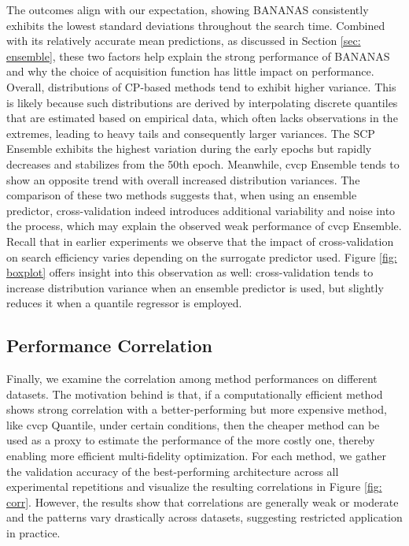 \documentclass[a4paper,oneside,bibliography=totoc]{scrbook}
\begin{document}
The outcomes align with our expectation, showing BANANAS consistently exhibits the lowest standard deviations throughout the search time. Combined with its relatively accurate mean predictions, as discussed in Section \ref{sec: ensemble}, these two factors help explain the strong performance of BANANAS and why the choice of acquisition function has little impact on performance. Overall, distributions of CP-based methods tend to exhibit higher variance. This is likely because such distributions are derived by interpolating discrete quantiles that are estimated based on empirical data, which often lacks observations in the extremes, leading to heavy tails and consequently larger variances. The SCP Ensemble exhibits the highest variation during the early epochs but rapidly decreases and stabilizes from the 50th epoch. Meanwhile, \gls{cvcp} Ensemble tends to show an opposite trend with overall increased distribution variances. The comparison of these two methods suggests that, when using an ensemble predictor, cross-validation indeed introduces additional variability and noise into the process, which may explain the observed weak performance of \gls{cvcp} Ensemble. Recall that in earlier experiments we observe that the impact of cross-validation on search efficiency varies depending on the surrogate predictor used. Figure \ref{fig: boxplot} offers insight into this observation as well: cross-validation tends to increase distribution variance when an ensemble predictor is used, but slightly reduces it when a quantile regressor is employed.

\subsection{Performance Correlation}
Finally, we examine the correlation among method performances on different datasets. The motivation behind is that, if a computationally efficient method shows strong correlation with a better-performing but more expensive method, like \gls{cvcp} Quantile, under certain conditions, then the cheaper method can be used as a proxy to estimate the performance of the more costly one, thereby enabling more efficient multi-fidelity optimization. For each method, we gather the validation accuracy of the best-performing architecture across all experimental repetitions and visualize the resulting correlations in Figure \ref{fig: corr}. However, the results show that correlations are generally weak or moderate and the patterns vary drastically across datasets, suggesting restricted application in practice.
\end{document}
